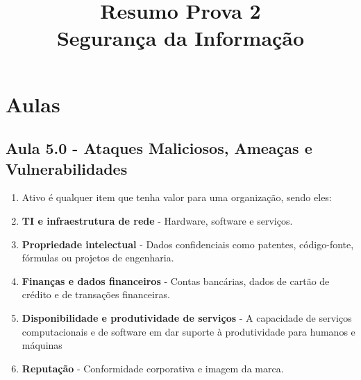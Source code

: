 \documentclass{report}
\title{Resumo Prova 2\\ Segurança da Informação}
\begin{document}
	\maketitle
	
	
	\section{Aulas}
	
	\subsection{Aula 5.0 - Ataques Maliciosos, Ameaças e Vulnerabilidades}
	
	\begin{enumerate}[label=--]
		
		\subsubsection{Segurança está na proteção de ativos de algum invasor}
		\item Ativo é qualquer item que tenha valor para uma organização, sendo eles:
		\item \textbf{TI e infraestrutura de rede} - Hardware, software e serviços.
		\item \textbf{Propriedade intelectual} - Dados confidenciais como patentes, código-fonte, fórmulas ou projetos de engenharia.
		\item \textbf{Finanças e dados financeiros} - Contas bancárias, dados de cartão de crédito e de transações
		financeiras.
		\item \textbf{Disponibilidade e produtividade de serviços} - A capacidade de serviços computacionais e de
		software em dar suporte à produtividade para humanos e máquinas
		\item \textbf{Reputação} - Conformidade corporativa e imagem da marca.
		

\end{enumerate}
\end{document}
